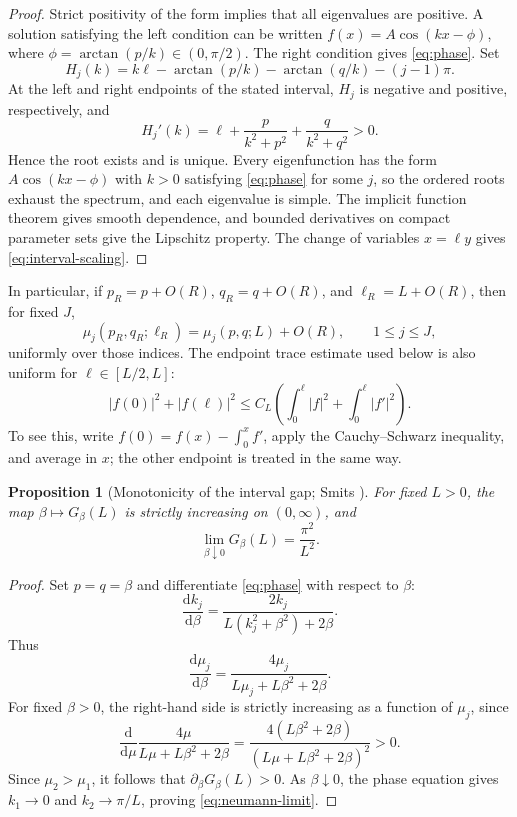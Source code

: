 \documentclass[11pt,a4paper]{article}
\numberwithin{equation}{section}
\theoremstyle{paperplain}
\newtheorem{proposition}[theorem]{Proposition}
\theoremstyle{remark}
\begin{document}
\begin{proof}
Strict positivity of the form implies that all eigenvalues are positive.
A solution satisfying the left condition can be written
$f(x)=A\cos(kx-\phi)$, where $\phi=\arctan(p/k)\in(0,\pi/2)$.
The right condition gives \eqref{eq:phase}. Set
\[
 H_j(k)=k\ell-\arctan(p/k)-\arctan(q/k)-(j-1)\pi.
\]
At the left and right endpoints of the stated interval, $H_j$ is negative and
positive, respectively, and
\[
 H_j'(k)=\ell+\frac{p}{k^2+p^2}+\frac{q}{k^2+q^2}>0.
\]
Hence the root exists and is unique. Every eigenfunction has the form
$A\cos(kx-\phi)$ with $k>0$ satisfying \eqref{eq:phase} for some $j$, so
the ordered roots exhaust the spectrum, and each eigenvalue is simple. The
implicit function theorem gives smooth dependence, and bounded derivatives
on compact parameter sets give the Lipschitz property. The change of
variables $x=\ell y$ gives \eqref{eq:interval-scaling}.
\end{proof}

In particular, if $p_R=p+O(R)$, $q_R=q+O(R)$, and $\ell_R=L+O(R)$, then for
fixed $J$,
\begin{equation}\label{eq:interval-O-R}
 \mu_j(p_R,q_R;\ell_R)=\mu_j(p,q;L)+O(R),\qquad 1\le j\le J,
\end{equation}
uniformly over those indices. The endpoint trace estimate used below is also
uniform for $\ell\in[L/2,L]$:
\begin{equation}\label{eq:interval-trace}
 |f(0)|^2+|f(\ell)|^2
 \le C_L\left(\int_0^\ell |f|^2+\int_0^\ell|f'|^2\right).
\end{equation}
To see this, write $f(0)=f(x)-\int_0^x f'$, apply the Cauchy--Schwarz
inequality, and average in $x$; the other endpoint is treated in the same
way.

\begin{proposition}[Monotonicity of the interval gap; Smits \cite{Smits}]\label{prop:gap-monotone}
For fixed $L>0$, the map $\beta\mapsto G_\beta(L)$ is strictly increasing on
$(0,\infty)$, and
\begin{equation}\label{eq:neumann-limit}
 \lim_{\beta\downarrow0}G_\beta(L)=\frac{\pi^2}{L^2}.
\end{equation}
\end{proposition}

\begin{proof}
Set $p=q=\beta$ and differentiate \eqref{eq:phase} with respect to $\beta$:
\[
 \frac{\mathrm d k_j}{\mathrm d\beta}
 =\frac{2k_j}{L(k_j^2+\beta^2)+2\beta}.
\]
Thus
\[
 \frac{\mathrm d\mu_j}{\mathrm d\beta}
 =\frac{4\mu_j}{L\mu_j+L\beta^2+2\beta}.
\]
For fixed $\beta>0$, the right-hand side is strictly increasing as a function
of $\mu_j$, since
\[
 \frac{\mathrm d}{\mathrm d\mu}
 \frac{4\mu}{L\mu+L\beta^2+2\beta}
 =\frac{4(L\beta^2+2\beta)}{(L\mu+L\beta^2+2\beta)^2}>0.
\]
Since $\mu_2>\mu_1$, it follows that $\partial_\beta G_\beta(L)>0$.
As $\beta\downarrow0$, the phase equation gives $k_1\to0$ and
$k_2\to\pi/L$, proving \eqref{eq:neumann-limit}.
\end{proof}
\end{document}
